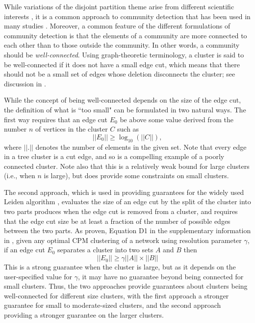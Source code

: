 \documentclass[12pt, oneside]{article}   	%
\begin{document}
While variations of the disjoint partition theme arise from different scientific interests \citep{Coscia2011,Schaub2017}, it is a  common approach to community detection that has been used in many 
studies \citep{Fortunato2022,Fortunato2010}.
Moreover, a common feature of the different formulations of community detection is that  the elements of a community are more connected to each other than to those outside the community. 
In other words, a community should be {\em well-connected}.
Using graph-theoretic terminology, a cluster is said to be well-connected if it does not have a small 
edge cut, which means that there should not be a small set of edges whose deletion disconnects the cluster; see discussion in \cite{Traag_2019}. 

While the concept of being well-connected depends on the size of the edge cut, the definition of what is ``too small" can be formulated in two
natural ways.
The first way
requires that an edge cut  $E_0$ be above some value derived from the number $n$ of 
vertices in the cluster $C$ such as $$||E_0|| \geq \log_{10}(||C||),$$    where $||.||$ denotes the number of elements in the given set.
Note that every edge in  a tree cluster is a cut edge, and so is  a compelling example of a poorly connected cluster. 
Note also that this is a relatively weak bound for large clusters (i.e., when   $n$ is large), but does provide some constraints on small clusters. 

The second approach, which is used in providing guarantees for the widely used Leiden algorithm \citep{Traag_2019}, evaluates the size of an edge cut by the split  of the cluster into two parts produces 
when the edge cut is removed from a cluster, and requires that the edge cut size be at least a fraction of the number of possible edges between the two  parts.
As proven, Equation D1 in the supplementary information in \cite{Traag_2019}, given any optimal CPM clustering of a network using resolution parameter $\gamma$, if an edge cut $E_0$
separates a cluster into two sets $A$ and $B$ then $$||E_0|| \geq \gamma ||A|| \times ||B||$$
This is a strong guarantee when the cluster is large,  but as it depends on the user-specified value for $\gamma$, it may have no guarantee  beyond being connected for small clusters.
Thus, the two approaches provide guarantees about clusters being well-connected for different size clusters, with the first approach a stronger guarantee for small to moderate-sized clusters, and the second approach providing a stronger guarantee on the larger clusters.
\end{document}
